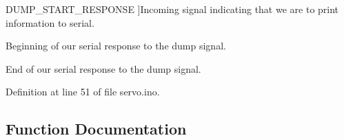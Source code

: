 \begin{Desc}
\begin{description}
{\hypertarget{servo_8ino_a06fc87d81c62e9abb8790b6e5713c55ba51975080564db9aa29bff29cce328b5f}{}D\+U\+M\+P\+\_\+\+S\+T\+A\+R\+T\+\_\+\+R\+E\+S\+P\+O\+N\+S\+E\label{servo_8ino_a06fc87d81c62e9abb8790b6e5713c55ba51975080564db9aa29bff29cce328b5f}
}]Incoming signal indicating that we are to print information to serial. \item[{\em 
\hypertarget{servo_8ino_a06fc87d81c62e9abb8790b6e5713c55baa7ca295335eb71b345d3b0bd0e53277e}{}D\+U\+M\+P\+\_\+\+E\+N\+D\+\_\+\+R\+E\+S\+P\+O\+N\+S\+E\label{servo_8ino_a06fc87d81c62e9abb8790b6e5713c55baa7ca295335eb71b345d3b0bd0e53277e}
}]Beginning of our serial response to the dump signal. \item[{\em 
\hypertarget{servo_8ino_a06fc87d81c62e9abb8790b6e5713c55baebe1616f434c26e10f088aebf559d708}{}D\+U\+M\+P\+\_\+\+R\+E\+S\+P\+O\+N\+S\+E\+\_\+\+L\+E\+N\label{servo_8ino_a06fc87d81c62e9abb8790b6e5713c55baebe1616f434c26e10f088aebf559d708}
}]End of our serial response to the dump signal. \end{description}
\end{Desc}


Definition at line 51 of file servo.\+ino.



\subsection{Function Documentation}
\hypertarget{servo_8ino_accd2600060dbaee3a3b41aed4034c63c}{}
